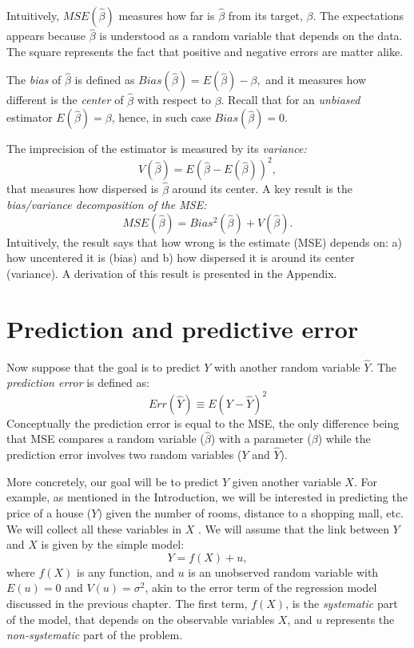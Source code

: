 Intuitively, $MSE(\hat \beta)$ measures how far is $\hat \beta$ from its target, $\beta$. The expectations appears because $\hat \beta$ is understood as a random variable that depends on the data. The square represents the fact that positive and negative errors are matter alike. 

The \emph{bias} of $\hat \beta$ is defined as
$Bias(\hat \beta) = E(\hat \beta) - \beta,$
and it measures how different is the \emph{center} of $\hat \beta$ with respect to $\beta$. Recall that for an \emph{unbiased} estimator $E(\hat \beta) = \beta$, hence, in such case $Bias(\hat \beta) = 0$. 

The imprecision of the estimator is measured by its \emph{variance:}
\[V(\hat \beta) = E\left(\hat \beta - E(\hat \beta)\right)^2,\]
that measures how dispersed is $\hat \beta$ around its center. A key result is the \emph{bias/variance decomposition of the MSE:}
\[MSE(\hat \beta) = Bias^2(\hat \beta)+V(\hat \beta).\]
Intuitively, the result says that how wrong is the estimate (MSE) depends on: a) how uncentered it is (bias) and b) how dispersed it is around its center (variance). A derivation of this result is presented in the Appendix. 

\section{Prediction and predictive error}

Now suppose that the goal is to predict $Y$ with another random variable $\hat Y$. The \emph{prediction error} is defined as:
\[Err(\hat Y) \equiv E\left(Y-\hat Y\right)^2\]
Conceptually the prediction error is equal to the MSE, the only difference being that MSE compares  a random variable ($\hat \beta$) with a parameter ($\beta$) while the prediction error involves two random variables ($Y$ and $\hat Y$).


More concretely, our goal will be to predict $Y$ given another variable $X$. For example, as mentioned in the Introduction, we will be interested in predicting the price of a house ($Y$) given the number of rooms, distance to a shopping mall, etc. We will collect all these variables in $X$ . We will assume that the link between $Y$ and $X$ is given by the simple model:
\[Y = f(X) + u,\] 
where $f(X)$ is any function, and $u$ is an unobserved random variable with $E(u)=0$ and $V(u) = \sigma^2$, akin to the error term of the regression model discussed in the previous chapter. The first term, $f(X)$, is the \emph{systematic} part of the model, that depends on the observable variables $X$, and $u$ represents the \emph{non-systematic} part of the problem. 


